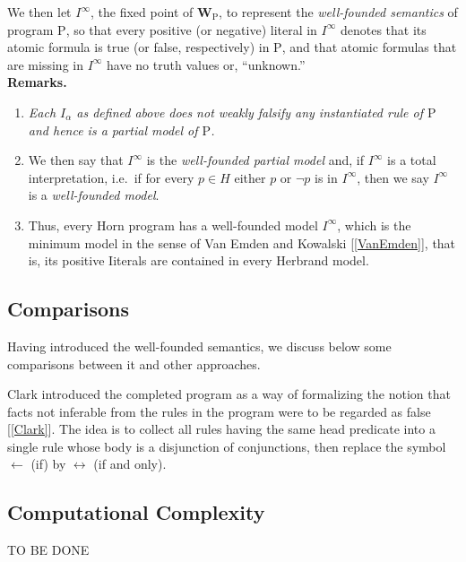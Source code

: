 We then let $I^\infty$, the fixed point of $\mathbf{W}_\mathrm{P}$, to represent the \emph{well-founded semantics} of program $\mathrm{P}$, so that every positive (or negative) literal in $I^\infty$ denotes that its atomic formula is true (or false, respectively) in $\mathrm{P}$, and that atomic formulas that are missing in $I^\infty$ have no truth values or, ``unknown.''
\medskip\\
\textbf{Remarks.}
\begin{enumerate}[label=(\alph*)]
%
\item \emph{Each $I_\alpha$ as defined above does not weakly falsify any instantiated rule of $\mathrm{P}$ and hence is a partial model of $\mathrm{P}$.}
%
\item We then say that $I^\infty$ is the \emph{well-founded partial model} and, if $I^\infty$ is a total interpretation, i.e.\ if for every $p \in H$ either $p$ or $\neg p$ is in $I^\infty$, then we say $I^\infty$ is a \emph{well-founded model}.
%
\item Thus, every Horn program has a well-founded model $I^\infty$, which is the minimum model in the sense of Van Emden and Kowalski [\ref{VanEmden}], that is, its positive Iiterals are contained in every Herbrand model.
%
\end{enumerate}
\subsection{Comparisons}
Having introduced the well-founded semantics, we discuss below some comparisons between it and other approaches.

Clark introduced the completed program as a way of formalizing the notion that facts not inferable from the rules in the program were to be regarded as false [\ref{Clark}]. The idea is to collect all rules having the same head predicate into a single rule whose body is a disjunction of conjunctions, then replace the symbol $\leftarrow$ (if) by $\leftrightarrow$ (if and only).
\subsection{Computational Complexity}
TO BE DONE